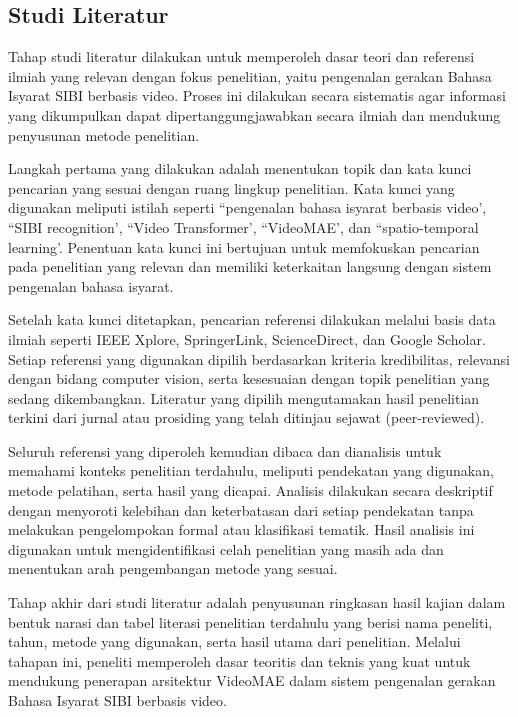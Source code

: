 \subsection{Studi Literatur} \label{III.Studi_Literatur}
Tahap studi literatur dilakukan untuk memperoleh dasar teori dan referensi ilmiah yang relevan dengan fokus penelitian, yaitu pengenalan gerakan Bahasa Isyarat SIBI berbasis video. Proses ini dilakukan secara sistematis agar informasi yang dikumpulkan dapat dipertanggungjawabkan secara ilmiah dan mendukung penyusunan metode penelitian.\par

Langkah pertama yang dilakukan adalah menentukan topik dan kata kunci pencarian yang sesuai dengan ruang lingkup penelitian. Kata kunci yang digunakan meliputi istilah seperti ``pengenalan bahasa isyarat berbasis video', ``SIBI recognition', ``Video Transformer', ``VideoMAE', dan ``spatio-temporal learning'. Penentuan kata kunci ini bertujuan untuk memfokuskan pencarian pada penelitian yang relevan dan memiliki keterkaitan langsung dengan sistem pengenalan bahasa isyarat.\par

Setelah kata kunci ditetapkan, pencarian referensi dilakukan melalui basis data ilmiah seperti IEEE Xplore, SpringerLink, ScienceDirect, dan Google Scholar. Setiap referensi yang digunakan dipilih berdasarkan kriteria kredibilitas, relevansi dengan bidang computer vision, serta kesesuaian dengan topik penelitian yang sedang dikembangkan. Literatur yang dipilih mengutamakan hasil penelitian terkini dari jurnal atau prosiding yang telah ditinjau sejawat (peer-reviewed).\par

Seluruh referensi yang diperoleh kemudian dibaca dan dianalisis untuk memahami konteks penelitian terdahulu, meliputi pendekatan yang digunakan, metode pelatihan, serta hasil yang dicapai. Analisis dilakukan secara deskriptif dengan menyoroti kelebihan dan keterbatasan dari setiap pendekatan tanpa melakukan pengelompokan formal atau klasifikasi tematik. Hasil analisis ini digunakan untuk mengidentifikasi celah penelitian yang masih ada dan menentukan arah pengembangan metode yang sesuai.\par

Tahap akhir dari studi literatur adalah penyusunan ringkasan hasil kajian dalam bentuk narasi dan tabel literasi penelitian terdahulu yang berisi nama peneliti, tahun, metode yang digunakan, serta hasil utama dari penelitian. Melalui tahapan ini, peneliti memperoleh dasar teoritis dan teknis yang kuat untuk mendukung penerapan arsitektur VideoMAE dalam sistem pengenalan gerakan Bahasa Isyarat SIBI berbasis video.\par


